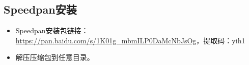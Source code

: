 \subsection{Speedpan安装}
\begin{itemize}
\item Speedpan安装包链接：\url{https://pan.baidu.com/s/1K01g_mbmILP0DaMcNbJsOg}，提取码：yih1
\item 解压压缩包到任意目录。
\end{itemize}

